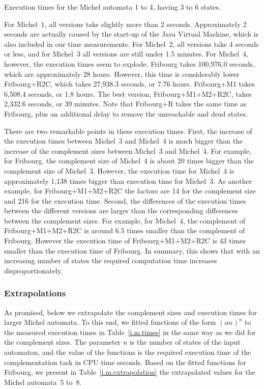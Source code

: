 \begin{table}[htb]
\centering

\caption{Execution times for the Michel automata 1 to 4, having 3 to 6 states.}
\label{i.m.times}
\end{table}

For Michel~1, all versions take slightly more than 2 seconds. Approximately 2 seconds are actually caused by the start-up of the Java Virtual Machine, which is also included in our time measurements. For Michel~2, all versions take 4 seconds or less, and for Michel~3 all versions are still under 1.5 minutes. For Michel~4, however, the execution times seem to explode. Fribourg takes 100,976.0 seconds, which are approximately 28 hours. However, this time is considerably lower Fribourg+R2C, which takes 27,938.3 seconds, or 7.76 hours. Fribourg+M1 takes 6,508.4 seconds, or 1.8 hours. The best version, Fribourg+M1+M2+R2C, takes 2,332.6 seconds, or 39 minutes. Note that Fribourg+R takes the same time as Fribourg, plus an additional delay to remove the unreachable and dead states.

There are two remarkable points in these execution times. First, the increase of the execution times between Michel~3 and Michel~4 is much bigger than the increase of the complement sizes between Michel~3 and Michel~4. For example, for Fribourg, the complement size of Michel~4 is about 20 times bigger than the complement size of Michel~3. However, the execution time for Michel~4 is approximately 1,138 times bigger than execution time for Michel~3. As another example, for Fribourg+M1+M2+R2C the factors are 14 for the complement size and 216 for the execution time. Second, the differences of the execution times between the different versions are larger than the corresponding differences between the complement sizes. For example, for Michel~4, the complement of Fribourg+M1+M2+R2C is around 6.5 times smaller than the complement of Fribourg. However the execution time of Fribourg+M1+M2+R2C is 43 times smaller than the execution time of Fribourg. In summary, this shows that with an increasing number of states the required computation time increases disproportionately.


\subsubsection{Extrapolations}
As promised, below we extrapolate the complement sizes and execution times for larger Michel automata. To this end, we fitted functions of the form $(an)^n$ to the measured execution times in Table~\ref{i.m.times} in the same way as we did for the complement sizes. The parameter $n$ is the number of states of the input automaton, and the value of the functions is the required execution time of the complementation task in CPU time seconds. Based on the fitted functions for Fribourg, we present in Table~\ref{i.m.extrapolation} the extrapolated values for the Michel automata~5 to~8.


